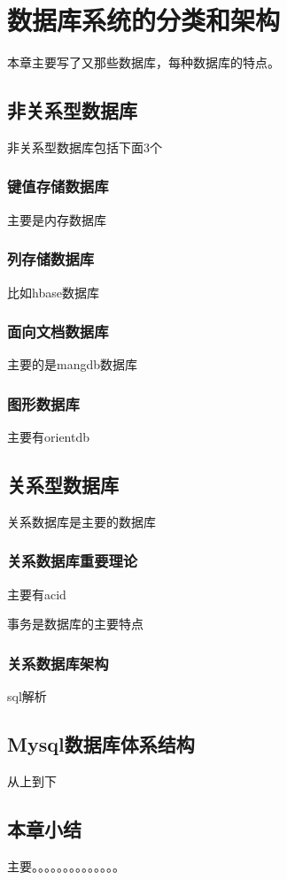 
\chapter{数据库系统的分类和架构}
本章主要写了又那些数据库，每种数据库的特点。
\section{非关系型数据库}
非关系型数据库包括下面3个
\subsection{键值存储数据库}
主要是内存数据库
\subsection{列存储数据库}
比如hbase数据库
\subsection{面向文档数据库}
主要的是mangdb数据库
\subsection{图形数据库}
主要有orientdb
\section{关系型数据库}
关系数据库是主要的数据库
\subsection{关系数据库重要理论}
主要有acid

事务是数据库的主要特点
\subsection{关系数据库架构}
sql解析

\section{Mysql数据库体系结构}
从上到下

\section{本章小结}
主要。。。。。。。。。。。。。。

